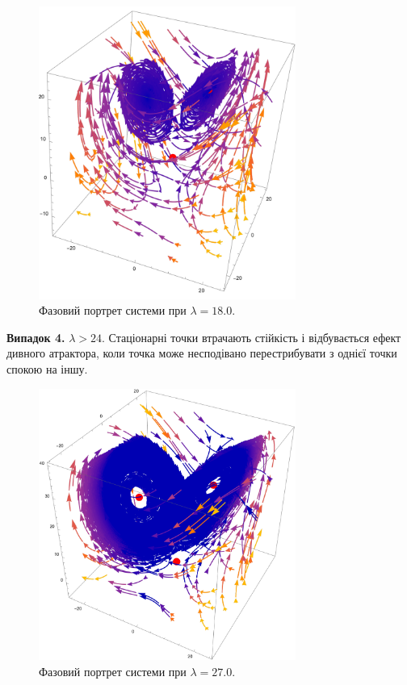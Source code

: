 \documentclass[oneside,solution]{tmpl}
\begin{document}
\begin{figure}[H]
    \centering
    \includegraphics[width=0.75\textwidth]{images/hw_8/lorentz_case_3.pdf}
    \caption{Фазовий портрет системи при $\lambda = 18.0$.}
\end{figure}

\textbf{Випадок 4.} $\lambda > 24$. Стаціонарні точки втрачають стійкість і відбувається ефект дивного атрактора, коли точка може несподівано перестрибувати з однієї точки спокою на іншу.

\begin{figure}[H]
    \centering
    \includegraphics[width=0.75\textwidth]{images/hw_8/lorentz_case_4.pdf}
    \caption{Фазовий портрет системи при $\lambda = 27.0$.}
\end{figure}
\pagebreak
{}
\end{document}
